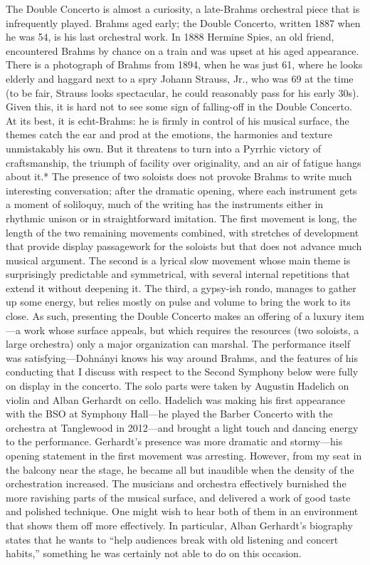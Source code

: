 The Double Concerto is almost a curiosity, a late-Brahms orchestral piece that is infrequently played. Brahms aged early; the Double Concerto, written 1887 when he was 54, is his last orchestral work. In 1888 Hermine Spies, an old friend, encountered Brahms by chance on a train and was upset at his aged appearance. There is a photograph of Brahms from 1894, when he was just 61, where he looks elderly and haggard next to a spry Johann Strauss, Jr., who was 69 at the time (to be fair, Strauss looks spectacular, he could reasonably pass for his early 30s). Given this, it is hard not to see some sign of falling-off in the Double Concerto. At its best, it is echt-Brahms: he is firmly in control of his musical surface, the themes catch the ear and prod at the emotions, the harmonies and texture unmistakably his own. But it threatens to turn into a Pyrrhic victory of craftsmanship, the triumph of facility over originality, and an air of fatigue hangs about it.* The presence of two soloists does not provoke Brahms to write much interesting conversation; after the dramatic opening, where each instrument gets a moment of soliloquy, much of the writing has the instruments either in rhythmic unison or in straightforward imitation. The first movement is long, the length of the two remaining movements combined, with stretches of development that provide display passagework for the soloists but that does not advance much musical argument. The second is a lyrical slow movement whose main theme is surprisingly predictable and symmetrical, with several internal repetitions that extend it without deepening it. The third, a gypsy-ish rondo, manages to gather up some energy, but relies mostly on pulse and volume to bring the work to its close. As such, presenting the Double Concerto makes an offering of a luxury item—a work whose surface appeals, but which requires the resources (two soloists, a large orchestra) only a major organization can marshal. The performance itself was satisfying—Dohnányi knows his way around Brahms, and the features of his conducting that I discuss with respect to the Second Symphony below were fully on display in the concerto. The solo parts were taken by Augustin Hadelich on violin and Alban Gerhardt on cello. Hadelich was making his first appearance with the BSO at Symphony Hall—he played the Barber Concerto with the orchestra at Tanglewood in 2012—and brought a light touch and dancing energy to the performance. Gerhardt’s presence was more dramatic and stormy—his opening statement in the first movement was arresting. However, from my seat in the balcony near the stage, he became all but inaudible when the density of the orchestration increased. The musicians and orchestra effectively burnished the more ravishing parts of the musical surface, and delivered a work of good taste and polished technique. One might wish to hear both of them in an environment that shows them off more effectively. In particular, Alban Gerhardt’s biography states that he wants to “help audiences break with old listening and concert habits,” something he was certainly not able to do on this occasion.


